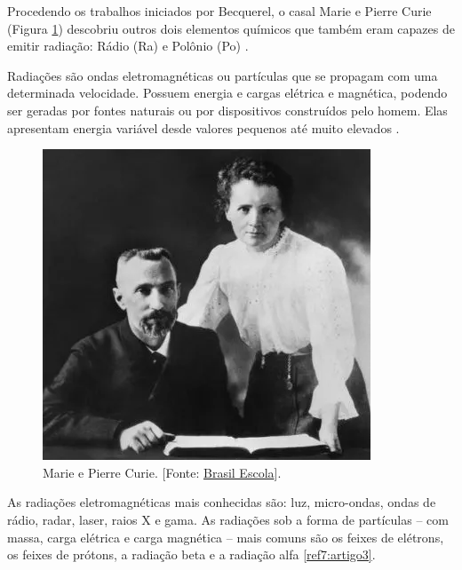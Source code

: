 \begin{multicols}{2}
Procedendo os trabalhos iniciados por Becquerel, o casal Marie e Pierre Curie (Figura \ref{fig:MarieEPierre}) descobriu outros dois elementos químicos que também eram capazes de emitir radiação:  Rádio (Ra) e Polônio (Po) .


Radiações são ondas eletromagnéticas ou partículas que se propagam com uma determinada velocidade. Possuem energia e cargas elétrica e magnética, podendo ser geradas por fontes naturais ou por dispositivos construídos pelo homem. Elas apresentam energia variável desde valores pequenos até muito elevados .

\begin{figure}[H]
			\centering
			\includegraphics[width=\linewidth]{Figuras/Artigo3/Marie & Pierre Curie.png}
			\caption{Marie e Pierre Curie. [Fonte: \href{https://brasilescola.uol.com.br/quimica/maria-curie-descoberta-radioatividade.htm}{Brasil Escola}].}
			\label{fig:MarieEPierre}
\end{figure}


As radiações eletromagnéticas mais conhecidas são: luz, micro-ondas, ondas de rádio, radar, laser, raios X e gama. As radiações sob a forma de partículas – com massa, carga elétrica e carga magnética – mais comuns são os feixes de elétrons, os feixes de prótons, a radiação beta e a radiação alfa \ref{ref7:artigo3}.


\end{multicols}
